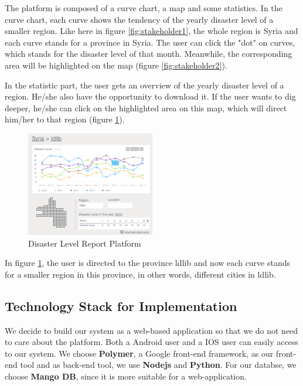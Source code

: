 The platform is composed of a curve chart,
a map and some statistics.
In the curve chart,
each curve shows the tendency of the yearly disaster level of a smaller region.
Like here in figure \ref{fig:stakeholder1}, 
the whole region is Syria and each curve stands for a province in Syria.
The user can click the "dot" on curves,
which stands for the disaster level of that month.
Meanwhile, the corresponding area will be highlighted on the map (figure \ref{fig:stakeholder2}).

In the statistic part,
the user gets an overview of the yearly disaster level of a region.
He/she also have the opportunity to download it.
If the user wants to dig deeper, 
he/she can click on the highlighted area on this map,
which will direct him/her to that region (figure \ref{fig:stakeholder3}).

\begin{figure}[H]
\centering
\includegraphics[width=0.5\textwidth]{figures/function-stakeholder-3}
\caption{Disaster Level Report Platform}
\label{fig:stakeholder3}
\end{figure}

In figure \ref{fig:stakeholder3},
the user is directed to the province ldlib and now each curve stands for a smaller region in this province,
in other words, different cities in ldlib.
    
\subsection{Technology Stack for Implementation}

We decide to build our system as a web-based application so that we do not need to care about the platform.
Both a Android user and a IOS user can easily access to our system. We choose \textbf{Polymer}, 
a Google front-end framework, as our front-end tool and as back-end tool, we use \textbf{Nodejs} and \textbf{Python}. 
For our databse, we choose \textbf{Mango DB}, since it is more suitable for a web-application.